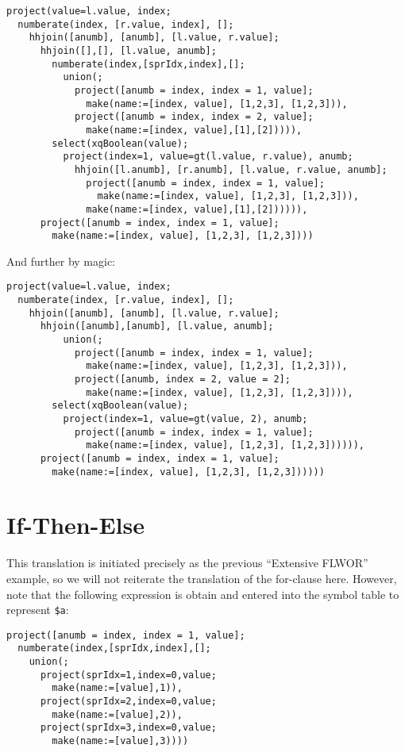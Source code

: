 \begin{Verbatim}
project(value=l.value, index;
  numberate(index, [r.value, index], [];
    hhjoin([anumb], [anumb], [l.value, r.value];
      hhjoin([],[], [l.value, anumb];
        numberate(index,[sprIdx,index],[];
          union(;
            project([anumb = index, index = 1, value];
              make(name:=[index, value], [1,2,3], [1,2,3])),
            project([anumb = index, index = 2, value];
              make(name:=[index, value],[1],[2])))),
        select(xqBoolean(value);
          project(index=1, value=gt(l.value, r.value), anumb;
            hhjoin([l.anumb], [r.anumb], [l.value, r.value, anumb];
              project([anumb = index, index = 1, value];
                make(name:=[index, value], [1,2,3], [1,2,3])),
              make(name:=[index, value],[1],[2]))))),
      project([anumb = index, index = 1, value];
        make(name:=[index, value], [1,2,3], [1,2,3])))
\end{Verbatim}

And further by magic:

\begin{Verbatim}
project(value=l.value, index;
  numberate(index, [r.value, index], [];
    hhjoin([anumb], [anumb], [l.value, r.value];
      hhjoin([anumb],[anumb], [l.value, anumb];
          union(;
            project([anumb = index, index = 1, value];
              make(name:=[index, value], [1,2,3], [1,2,3])),
            project([anumb, index = 2, value = 2];
              make(name:=[index, value], [1,2,3], [1,2,3]))),
        select(xqBoolean(value);
          project(index=1, value=gt(value, 2), anumb;
            project([anumb = index, index = 1, value];
              make(name:=[index, value], [1,2,3], [1,2,3]))))),
      project([anumb = index, index = 1, value];
        make(name:=[index, value], [1,2,3], [1,2,3])))))
\end{Verbatim}


\section{If-Then-Else}
\label{appendix:transl:ifthenelse}
This translation is initiated precisely as the previous ``Extensive FLWOR''
example, so we will not reiterate the translation of the for-clause here.
However, note that the following expression is obtain and entered into the
symbol table to represent \texttt{\$a}:

\begin{Verbatim}
project([anumb = index, index = 1, value];
  numberate(index,[sprIdx,index],[];
    union(;
      project(sprIdx=1,index=0,value;
        make(name:=[value],1)),
      project(sprIdx=2,index=0,value;
        make(name:=[value],2)),
      project(sprIdx=3,index=0,value;
        make(name:=[value],3))))
\end{Verbatim}

